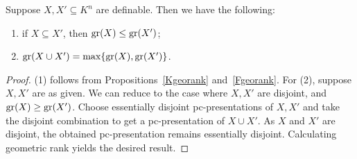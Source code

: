 \begin{cor} \label{grbehavior2}
Suppose $X, X' \subseteq K^n $ are definable. Then we have the following:
\begin{enumerate}
\item if $X \subseteq X'$, then $\mathrm{gr}(X) \leq \mathrm{gr}(X')$;
\item $\mathrm{gr}(X \cup X') = \max\{\mathrm{gr}(X), \mathrm{gr}(X') \}$.
\end{enumerate}

\end{cor}

\begin{proof}
(1) follows from Propositions~\ref{Kgeorank} and~\ref{Fgeorank}. For (2), suppose $X, X'$ are as given. We can reduce to the case where $X, X'$ are disjoint, and $\mathrm{gr}(X) \geq \mathrm{gr}(X')$. Choose essentially disjoint pc-presentations of $X,X'$ and take the disjoint combination to get a pc-presentation of $X \cup X'$. As $X$ and $X'$ are disjoint, the obtained pc-presentation remains essentially disjoint. Calculating geometric rank yields the desired result.
\end{proof}

